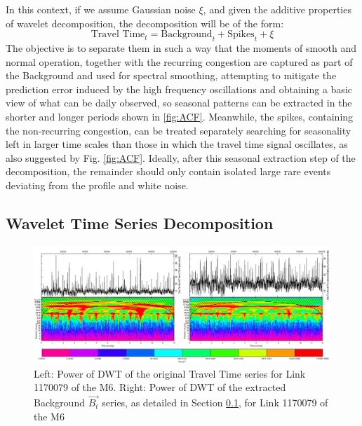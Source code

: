 \documentclass[a4paper, 10pt, conference]{ieeeconf}      %
\begin{document}
In this context, if we assume Gaussian noise $\xi$, and given the additive properties of wavelet decomposition, the decomposition will be of the form:
\begin{equation}
\textrm{Travel Time}_t  = \textrm{Background}_t + \textrm{Spikes}_t + \xi
\end{equation}
The objective is to separate them in such a way that the moments of smooth and normal operation, together with the recurring congestion are captured as part of the Background and used for spectral smoothing, attempting to mitigate the prediction error induced by the high frequency oscillations and obtaining a basic view of what can be daily observed, so seasonal patterns can be extracted in the shorter and longer periods shown in \ref{fig:ACF}.
Meanwhile, the spikes, containing the non-recurring congestion, can be treated separately searching for seasonality left in larger time scales than those in which the travel time signal oscillates, as also suggested by Fig. \ref{fig:ACF}. 
Ideally, after this seasonal extraction step of the decomposition, the remainder should only contain isolated large rare events deviating from the profile and white noise.
\subsection{Wavelet Time Series Decomposition}\label{decomposition}
\begin{figure}[htbp]
	\centerline{\includegraphics[width=\linewidth]{./images/WT_combined_1500_600.png}}
	\caption{Left: Power of DWT of the original Travel Time series for Link 1170079 of the M6.
	Right: Power of DWT of the extracted Background $\vec{B_t}$ series, as detailed in Section \ref{decomposition}, for Link 1170079 of the M6}
	\label{fig:wt}
\end{figure}
\end{document}
